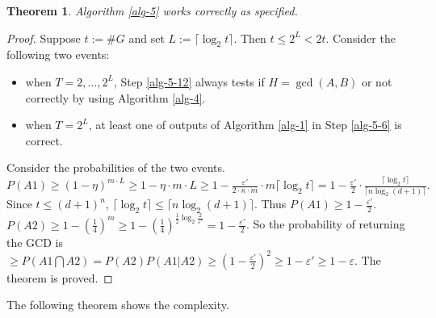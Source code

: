 \documentclass[final,20pt]{elsarticle}
\newtheorem{theorem}{Theorem}[section]
\begin{document}
\begin{theorem}
\label{th-10}
Algorithm \ref{alg-5} works correctly as specified.
\end{theorem}
%
\begin{proof}
 Suppose $t:=\#G$ and set $L:=\lceil \log_2 t\rceil$.
 Then $t\leq 2^{L}< 2t$.
%
Consider the following two events:
\begin{itemize}
\item[A1:] when $T=2,\dots,2^{L}$, Step \ref{alg-5-12} always tests if
$H=\gcd(A,B)$ or not correctly by using Algorithm \ref{alg-4}.
\item[A2:] when $T=2^{L}$, at least one of outputs of Algorithm \ref{alg-1} in Step \ref{alg-5-6} is correct.
\end{itemize}

Consider the probabilities of the two events. $P(A1) \geq (1-\eta)^{m\cdot L}\geq 1-\eta \cdot m\cdot L\geq 1-\frac{\varepsilon'}{2\cdot\kappa\cdot m}\cdot m\lceil \log_2 t\rceil=1-\frac{\varepsilon'}{2}\cdot \frac{\lceil \log_2 t\rceil}{\lceil n \log_2(d+1)\rceil}.$
%
Since $t\leq (d+1)^n$, $\lceil \log_2 t\rceil\leq \lceil n\log_2 (d+1)\rceil$. Thus $P(A1)\geq 1-\frac{\varepsilon'}{2}$.
%
$P(A2)\geq 1-(\frac{1}{4})^{m}\geq 1-(\frac{1}{4})^{\frac12\log_2\frac{2}{\varepsilon'}}=1-\frac{\varepsilon'}{2}$.
%
So the probability of returning the GCD is $\geq P(A1 \bigcap A2)=P(A2)P(A1|A2)\geq (1-\frac{\varepsilon'}{2})^2\geq
1-\varepsilon'\geq
1-\varepsilon$.
%
The theorem is proved.
\end{proof}

%
The following theorem shows the complexity.
%
\end{document}
